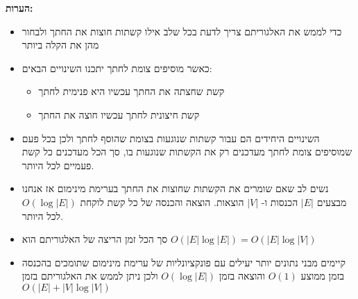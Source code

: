 \textbf{הערות:}
\begin{itemize}
\item
כדי לממש את האלגוריתם צריך לדעת בכל שלב אילו קשתות חוצות את החתך ולבחור מהן את הקלה ביותר
\item
כאשר מוסיפים צומת לחתך יתכנו השינויים הבאים:
\begin{itemize}
\item
קשת שחצתה את החתך עכשיו היא פנימית לחתך
\item
קשת חיצונית לחתך עכשיו חוצה את החתך
\end{itemize}
\item
השינויים היחידים הם עבור קשתות שנוגעות בצומת שהוסף לחתך ולכן בכל פעם שמוסיפים צומת לחתך 
מעדכנים רק את הקשתות שנוגעות בו, סך הכל מעדכנים כל קשת פעמיים לכל היותר.
\item
נשים לב שאם שומרים את הקשתות שחוצות את החתך בערימת מינימום אז 
אנחנו מבצעים 
$|E|$
הכנסות ו-%
$|V|$
הוצאות.
הוצאה והכנסה של כל קשת לוקחת
$O(\log |E|)$
לכל היותר. 
\item
סך הכל זמן הריצה של האלגוריתם הוא
$O(|E|\log|E|) = O(|E|\log|V|)$
\item
קיימים מבני נתונים יותר יעילים עם פונקציונליות של ערימת מינימום 
שתומכים בהכנסה בזמן ממוצע
$O(1)$
והוצאה בזמן 
$O(\log |E|)$
ולכן ניתן לממש את האלגוריתם בזמן 
$O(|E| + |V|\log |V|)$
\end{itemize}
